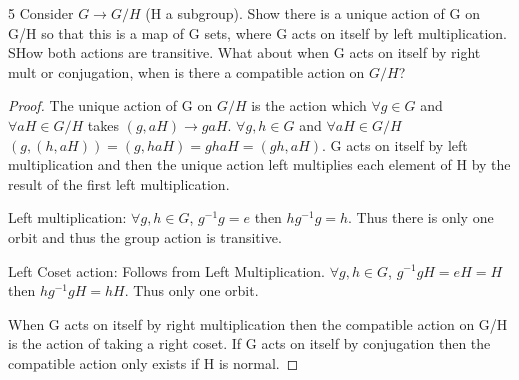 \documentclass{article}
\begin{document}
\begin{PROB}{5}\label{Problem 5.}
    Consider $G \to G/H$ (H a subgroup). Show there is a unique action of G on G/H so that this is a map of G sets, where G acts on itself by left multiplication.  SHow both actions are transitive. What about when G acts on itself by right mult or conjugation, when is there a compatible action on $G/H$? 
\end{PROB}
\begin{proof}
    The unique action of G on $G/H$ is the action which $\forall g \in G$ and $\forall aH \in G/H$ takes $(g, aH) \to gaH$. $\forall g, h \in G$ and $\forall aH \in G/H$ $(g, (h, aH)) = (g, haH) = ghaH = (gh, aH)$. G acts on itself by left multiplication and then the unique action left multiplies each element of H by the result of the first left multiplication. 

    Left multiplication: $\forall g, h \in G$, $g^{-1}g = e$ then $hg^{-1}g = h$. Thus there is only one orbit and thus the group action is transitive.

    Left Coset action: Follows from Left Multiplication. $\forall g, h \in G$, $g^{-1}gH = eH = H$ then $hg^{-1}gH = hH$. Thus only one orbit.

    When G acts on itself by right multiplication then the compatible action on G/H is the action of taking a right coset. If G acts on itself by conjugation then the compatible action only exists if H is normal.
\end{proof}

\bigskip
\end{document}
